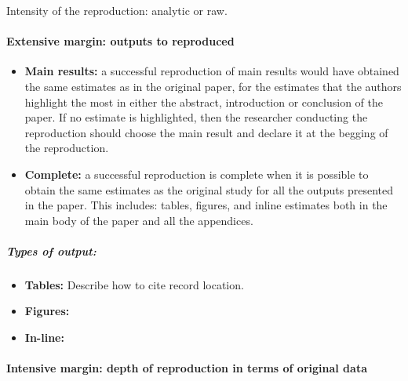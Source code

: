 \documentclass[]{book}
\providecommand{\tightlist}{%
  \setlength{\itemsep}{0pt}\setlength{\parskip}{0pt}}
\let\oldparagraph\paragraph
\renewcommand{\paragraph}[1]{\oldparagraph{#1}\mbox{}}
\let\oldsubparagraph\subparagraph
\renewcommand{\subparagraph}[1]{\oldsubparagraph{#1}\mbox{}}
\begin{document}
Intensity of the reproduction: analytic or raw.

\hypertarget{extensive-margin-outputs-to-reproduced}{%
\paragraph{Extensive margin: outputs to reproduced}\label{extensive-margin-outputs-to-reproduced}}

\begin{itemize}
\tightlist
\item
  \textbf{Main results:} a successful reproduction of main results would have obtained the same estimates as in the original paper, for the estimates that the authors highlight the most in either the abstract, introduction or conclusion of the paper. If no estimate is highlighted, then the researcher conducting the reproduction should choose the main result and declare it at the begging of the reproduction.
\item
  \textbf{Complete:} a successful reproduction is complete when it is possible to obtain the same estimates as the original study for all the outputs presented in the paper. This includes: tables, figures, and inline estimates both in the main body of the paper and all the appendices.
\end{itemize}

\hypertarget{types-of-output}{%
\subparagraph{Types of output:}\label{types-of-output}}

\begin{itemize}
\tightlist
\item
  \textbf{Tables:} Describe how to cite record location.
\item
  \textbf{Figures:}\\
\item
  \textbf{In-line:}
\end{itemize}

\hypertarget{intensive-margin-depth-of-reproduction-in-terms-of-original-data}{%
\paragraph{Intensive margin: depth of reproduction in terms of original data}\label{intensive-margin-depth-of-reproduction-in-terms-of-original-data}}
\end{document}
